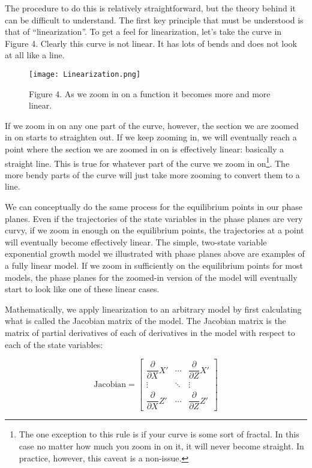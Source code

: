 \documentclass[]{memoir}
\let\Oldincludegraphics\includegraphics
\renewcommand{\includegraphics}[1]{\Oldincludegraphics[max size={\textwidth}{\textheight}]{#1}}
\begin{document}
The procedure to do this is relatively straightforward, but the theory
behind it can be difficult to understand. The first key principle that
must be understood is that of ``linearization''. To get a feel for
linearization, let's take the curve in Figure 4. Clearly this curve is
not linear. It has lots of bends and does not look at all like a line.

\begin{figure}[htbp]
\centering
\texttt{[image: Linearization.png]}
\caption{Figure 4. As we zoom in on a function it becomes more and more
linear.}
\end{figure}

If we zoom in on any one part of the curve, however, the section we are
zoomed in on starts to straighten out. If we keep zooming in, we will
eventually reach a point where the section we are zoomed in on is
effectively linear: basically a straight line. This is true for whatever
part of the curve we zoom in on\footnote{The one exception to this rule
  is if your curve is some sort of fractal. In this case no matter how
  much you zoom in on it, it will never become straight. In practice,
  however, this caveat is a non-issue.}. The more bendy parts of the
curve will just take more zooming to convert them to a line.

We can conceptually do the same process for the equilibrium points in
our phase planes. Even if the trajectories of the state variables in the
phase planes are very curvy, if we zoom in enough on the equilibrium
points, the trajectories at a point will eventually become effectively
linear. The simple, two-state variable exponential growth model we
illustrated with phase planes above are examples of a fully linear
model. If we zoom in sufficiently on the equilibrium points for most
models, the phase planes for the zoomed-in version of the model will
eventually start to look like one of these linear cases.

Mathematically, we apply linearization to an arbitrary model by first
calculating what is called the Jacobian matrix of the model. The
Jacobian matrix is the matrix of partial derivatives of each of
derivatives in the model with respect to each of the state variables:

\[ \text{Jacobian} = \begin{bmatrix} \dfrac{\partial }{\partial X} X' & \cdots & \dfrac{\partial }{\partial Z} X' \\ \vdots & \ddots & \vdots \\ \dfrac{\partial }{\partial X} Z' & \cdots & \dfrac{\partial }{\partial Z} Z'  \end{bmatrix} \]
\end{document}
